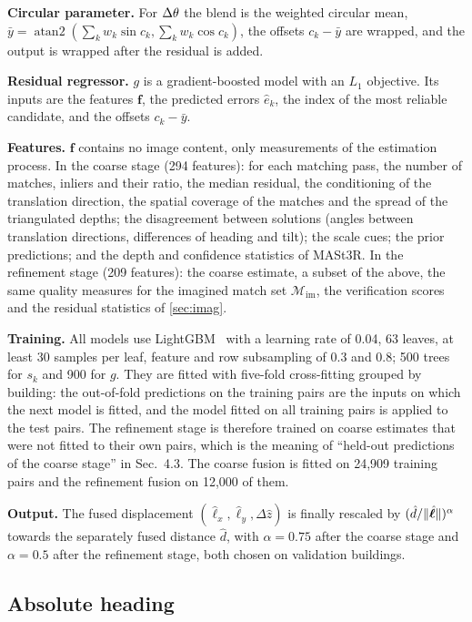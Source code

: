 \noindent\textbf{Circular parameter.} For $\Delta\theta$ the blend is the weighted circular mean, $\bar y=\operatorname{atan2}(\sum_k w_k\sin c_k,\sum_k w_k\cos c_k)$, the offsets $c_k-\bar y$ are wrapped, and the output is wrapped after the residual is added.

\noindent\textbf{Residual regressor.} $g$ is a gradient-boosted model with an $L_1$ objective. Its inputs are the features $\mathbf{f}$, the predicted errors $\hat e_k$, the index of the most reliable candidate, and the offsets $c_k-\bar y$.

\noindent\textbf{Features.} $\mathbf{f}$ contains no image content, only measurements of the estimation process. In the coarse stage (294 features): for each matching pass, the number of matches, inliers and their ratio, the median residual, the conditioning of the translation direction, the spatial coverage of the matches and the spread of the triangulated depths; the disagreement between solutions (angles between translation directions, differences of heading and tilt); the scale cues; the prior predictions; and the depth and confidence statistics of MASt3R. In the refinement stage (209 features): the coarse estimate, a subset of the above, the same quality measures for the imagined match set $\mathcal{M}_{\mathrm{im}}$, the verification scores and the residual statistics of \cref{sec:imag}.

\noindent\textbf{Training.} All models use LightGBM~\cite{ke2017lightgbm} with a learning rate of 0.04, 63 leaves, at least 30 samples per leaf, feature and row subsampling of 0.3 and 0.8; 500 trees for $s_k$ and 900 for $g$. They are fitted with five-fold cross-fitting grouped by building: the out-of-fold predictions on the training pairs are the inputs on which the next model is fitted, and the model fitted on all training pairs is applied to the test pairs. The refinement stage is therefore trained on coarse estimates that were not fitted to their own pairs, which is the meaning of ``held-out predictions of the coarse stage'' in Sec.~4.3. The coarse fusion is fitted on 24{,}909 training pairs and the refinement fusion on 12{,}000 of them.

\noindent\textbf{Output.} The fused displacement $(\hat\ell_x,\hat\ell_y,\Delta\hat z)$ is finally rescaled by $(\hat d/\|\hat{\bm{\ell}}\|)^{\alpha}$ towards the separately fused distance $\hat d$, with $\alpha{=}0.75$ after the coarse stage and $\alpha{=}0.5$ after the refinement stage, both chosen on validation buildings.

\subsection{Absolute heading}
\label{sec:absh}

